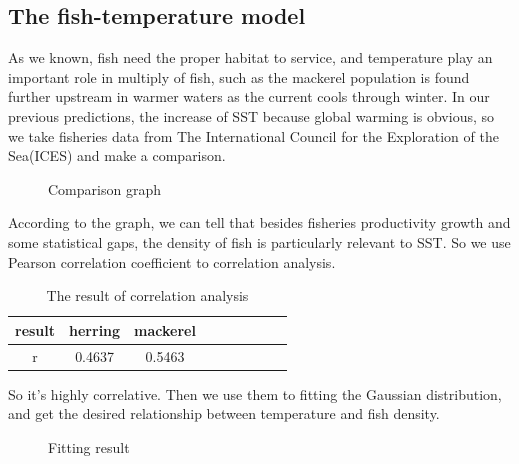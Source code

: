\documentclass{mcmthesis}
\begin{document}
 \subsection{The fish-temperature model}
  As we known, fish need the proper habitat to service, and temperature play an important role in multiply of fish, such as the mackerel population is found further upstream in warmer waters as the current cools through winter\cite{jansen2012migration}. In our previous predictions, the increase of  SST because global warming is obvious, so we take fisheries data  from The International Council for the Exploration of the Sea(ICES) and make a comparison. 

 \begin{figure}[tbp]
\caption{Comparison graph}\label{figure1}
 \end{figure}

  According to the graph, we can tell that besides fisheries productivity growth and some statistical gaps, the density of fish is particularly relevant to SST. So we use Pearson correlation coefficient to correlation analysis. 

  \begin{table}[!htb]
    \centering
    \setlength{\abovecaptionskip}{0pt}%
    \setlength{\belowcaptionskip}{15pt}%
    \caption{The result of correlation analysis}
    \begin{tabular}{ccccccccc}
    \toprule[1.5pt]
    result &herring &mackerel\\
    \toprule[1.5pt]
    r&0.4637&0.5463\\
    \bottomrule[1.5pt]
    \end{tabular}
  \end{table}

  So it's highly correlative. Then we use them to fitting the Gaussian distribution, and get the desired relationship between temperature and fish density.

\begin{figure}[tbp]
\caption{Fitting result}\label{figure1}
\end{figure}
\end{document}
